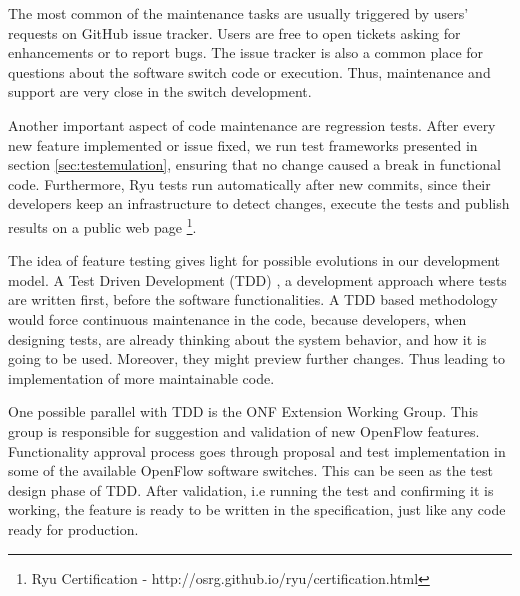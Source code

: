 The most common of the maintenance tasks are usually triggered by users' requests on GitHub issue tracker. Users are free to open tickets asking for enhancements or to report bugs. The issue tracker is also a common place for questions about the software switch code or execution. Thus, maintenance and support are very close in the switch development.          

Another important aspect of code maintenance are regression tests. After every new feature implemented or issue fixed, we run test frameworks presented in section \ref{sec:testemulation}, ensuring that no change caused a break in functional code. Furthermore, Ryu tests run automatically after new commits, since their developers keep an infrastructure to detect changes, execute the tests and publish results on a public web page \footnote{Ryu Certification - http://osrg.github.io/ryu/certification.html}. 

The idea of feature testing gives light for possible evolutions in our development model. A Test Driven Development (TDD) \cite{Nagappan:2008:RQI:1380662.1380664}, a development approach where tests are written first, before the software functionalities. A TDD based methodology would force continuous maintenance in the code, because developers, when designing tests, are already thinking about the system behavior, and how it is going to be used. Moreover, they might preview further changes. Thus leading to implementation of more maintainable code. 

One possible parallel with TDD is the ONF Extension Working Group. This group is responsible for suggestion and validation of new OpenFlow features. Functionality approval process goes through proposal and test implementation in some of the available OpenFlow software switches. This can be seen as the test design phase of TDD. After validation, i.e running the test and confirming it is working, the feature is ready to be written in the specification, just like any code ready for production.                 




 